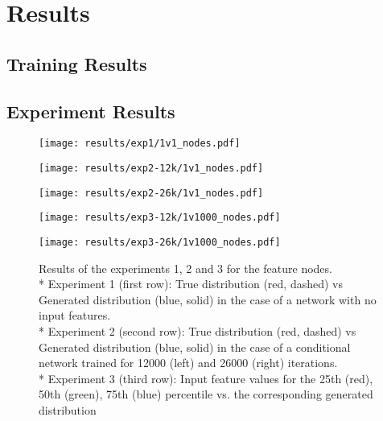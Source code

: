\chapter{Results}
\label{sec:results}
\section{Training Results}

\section{Experiment Results}
\begin{figure}[h!]
	\begin{minipage}{0.5\linewidth}
		\texttt{[image: results/exp1/1v1\_nodes.pdf]}
	\end{minipage}
	
	\begin{minipage}{0.5\linewidth}
		\texttt{[image: results/exp2-12k/1v1\_nodes.pdf]}
	\end{minipage}
	\begin{minipage}{0.5\linewidth}
		\texttt{[image: results/exp2-26k/1v1\_nodes.pdf]}
	\end{minipage}
	
	\begin{minipage}{0.5\linewidth}
		\texttt{[image: results/exp3-12k/1v1000\_nodes.pdf]}
	\end{minipage}
	\begin{minipage}{0.5\linewidth}
		\texttt{[image: results/exp3-26k/1v1000\_nodes.pdf]}
	\end{minipage}
	\caption[ Results: Input feature nodes]{ Results of the experiments 1, 2 and 3 for the feature nodes. \\* Experiment 1 (first row): True distribution (red, dashed) vs Generated distribution (blue, solid) in the case of a network with no input features. \\* Experiment 2 (second row): True distribution (red, dashed) vs Generated distribution (blue, solid) in the case of a conditional network trained for 12000 (left) and 26000 (right) iterations. \\* Experiment 3 (third row): Input feature values for the 25th (red), 50th (green), 75th (blue) percentile vs. the corresponding generated distribution}
	\label{fig:results_nodes}
\end{figure}
